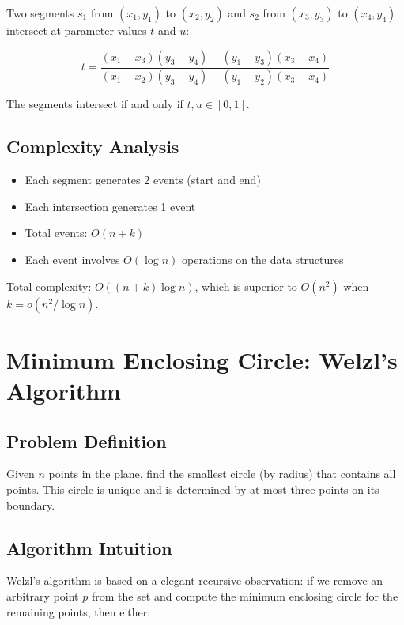 \documentclass[11pt,a4paper]{article}
\begin{document}
Two segments $s_1$ from $(x_1, y_1)$ to $(x_2, y_2)$ and $s_2$ from $(x_3, y_3)$ to $(x_4, y_4)$ intersect at parameter values $t$ and $u$:

\begin{equation}
    t = \frac{(x_1 - x_3)(y_3 - y_4) - (y_1 - y_3)(x_3 - x_4)}{(x_1 - x_2)(y_3 - y_4) - (y_1 - y_2)(x_3 - x_4)}
\end{equation}

The segments intersect if and only if $t, u \in [0, 1]$.

\subsection{Complexity Analysis}

\begin{itemize}
    \item Each segment generates 2 events (start and end)
    \item Each intersection generates 1 event
    \item Total events: $O(n + k)$
    \item Each event involves $O(\log n)$ operations on the data structures
\end{itemize}

Total complexity: $O((n + k) \log n)$, which is superior to $O(n^2)$ when $k = o(n^2 / \log n)$.

\section{Minimum Enclosing Circle: Welzl's Algorithm}

\subsection{Problem Definition}

Given $n$ points in the plane, find the smallest circle (by radius) that contains all points. This circle is unique and is determined by at most three points on its boundary.

\subsection{Algorithm Intuition}

Welzl's algorithm is based on a elegant recursive observation: if we remove an arbitrary point $p$ from the set and compute the minimum enclosing circle for the remaining points, then either:
\end{document}
